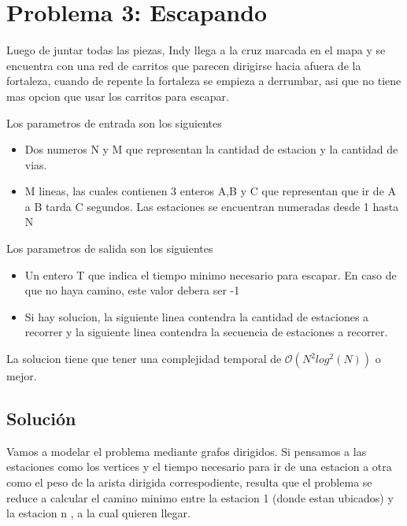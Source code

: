 \section{Problema 3: Escapando}

Luego de juntar todas las piezas, Indy llega a la cruz marcada en el mapa y se encuentra con una red de carritos que parecen dirigirse hacia afuera de la fortaleza, cuando de repente la fortaleza se empieza a derrumbar, asi que no tiene mas opcion que usar los carritos para escapar.

Los parametros de entrada son los siguientes

		\begin{itemize}
		\item Dos numeros N y M que representan la cantidad de estacion y la cantidad de vias.
		\item M lineas, las cuales contienen 3 enteros A,B y C que representan que ir de A a B tarda C segundos. Las estaciones se encuentran numeradas desde 1 hasta N
    		\end{itemize}

Los parametros de salida son los siguientes

	\begin{itemize}
	\item Un entero T que indica el tiempo minimo necesario para escapar. En caso de que no haya camino, este valor debera ser -1
	\item Si hay solucion, la siguiente linea contendra la cantidad de estaciones a recorrer y la siguiente linea contendra la secuencia de estaciones a recorrer.
	\end{itemize}

La solucion tiene que tener una complejidad temporal de $\mathcal{O}(N^{2}log^{2}(N))$ o mejor.

\subsection{Solución}

Vamos a modelar el problema mediante grafos dirigidos. Si pensamos a las estaciones como los vertices y el tiempo necesario para ir de una estacion a otra como el peso de la arista dirigida correspodiente, resulta que el problema se reduce a calcular el camino minimo entre la estacion 1 (donde estan ubicados) y la estacion n , a la cual quieren llegar.

